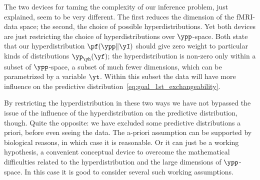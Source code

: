  \citep{draper1995}

% 
%
%

The two devices for taming the complexity of our inference problem, just
explained, seem to be very different. The first reduces the dimension of
the fMRI-data space; the second, the choice of possible hyperdistributions.
Yet both devices are just restricting the choice of hyperdistributions over
$\ypp$-space. Both state that our hyperdistribution $\pf(\ypp \|\yI)$
should give zero weight to particular kinds of distributions
$\yp_{\yh}(\yf)$; the hyperdistribution is non-zero only within a subset of
$\ypp$-space, a subset of much fewer dimensions, which can be parametrized
by a variable $\yt$. Within this subset the data will have more influence
on the predictive distribution~\eqref{eq:goal_1st_exchangeability}.

By restricting the hyperdistribution in these two ways we have not bypassed the
issue of the influence of the hyperdistribution on the predictive distribution,
though. Quite the opposite: we have excluded some predictive distributions
a priori, before even seeing the data. The a-priori assumption can be
supported by biological reasons, in which case it is reasonable. Or it can
just be a working hypothesis, a convenient conceptual device to overcome
the mathematical difficulties related to the hyperdistribution and the large
dimensions of $\ypp$-space. In this ca\label{sec:data_preprocessing}se it is good to consider several
such working assumptions.

